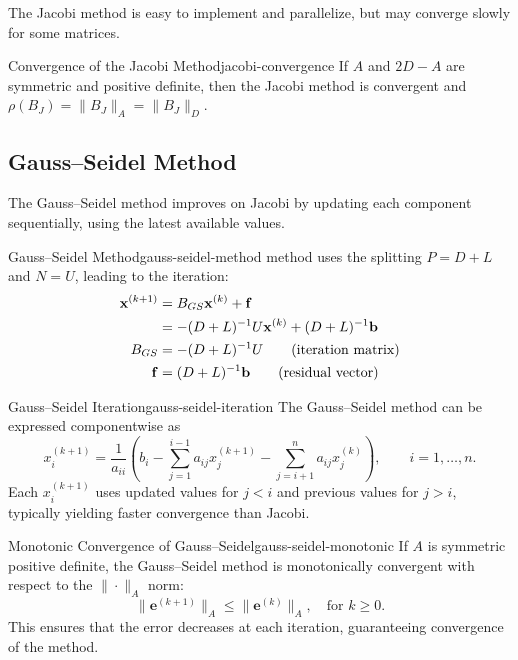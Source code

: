 The Jacobi method is easy to implement and parallelize, but may converge slowly for some matrices.
\begin{theorem}{Convergence of the Jacobi Method}{jacobi-convergence}
    If $A$ and $2D-A$ are symmetric and positive definite, then the Jacobi method is convergent and $\rho(B_J) = \|B_J\|_A = \|B_J\|_D$.
\end{theorem}


\subsection{Gauss--Seidel Method}
The Gauss--Seidel method improves on Jacobi by updating each component sequentially, using the latest available values.

\begin{definition}{Gauss--Seidel Method}{gauss-seidel-method}
    method uses the splitting \(P = D + L\) and \(N = U\), leading to the iteration:
        \begin{align}
            \mathbf{x}^{(k+1)} &= B_{GS} \mathbf{x}^{(k)} + \mathbf{f} \\
            &= -(D + L)^{-1}U \mathbf{x}^{(k)} + (D + L)^{-1}\mathbf{b} \notag \\
            B_{GS} &= -(D + L)^{-1}U \tag{iteration matrix} \\
            \mathbf{f} &= (D + L)^{-1}\mathbf{b} \tag{residual vector}
        \end{align}
\end{definition}
\begin{corollary}{Gauss--Seidel Iteration}{gauss-seidel-iteration}
    The Gauss--Seidel method can be expressed componentwise as
    \begin{equation}
        x_i^{(k+1)} = \frac{1}{a_{ii}}\left(b_i - \sum_{j=1}^{i-1} a_{ij} x_j^{(k+1)} - \sum_{j=i+1}^n a_{ij} x_j^{(k)}\right), \qquad i = 1, \ldots, n.
    \end{equation}
    Each \(x_i^{(k+1)}\) uses updated values for \(j < i\) and previous values for \(j > i\), typically yielding faster convergence than Jacobi.
\end{corollary}
\begin{theorem}{Monotonic Convergence of Gauss--Seidel}{gauss-seidel-monotonic}
    If $A$ is symmetric positive definite, the Gauss--Seidel method is monotonically convergent with respect to the $\|\cdot\|_A$ norm:
    \[
        \|\mathbf{e}^{(k+1)}\|_A \leq \|\mathbf{e}^{(k)}\|_A, \quad \text{for } k \geq 0.
    \]
    This ensures that the error decreases at each iteration, guaranteeing convergence of the method.
\end{theorem}
